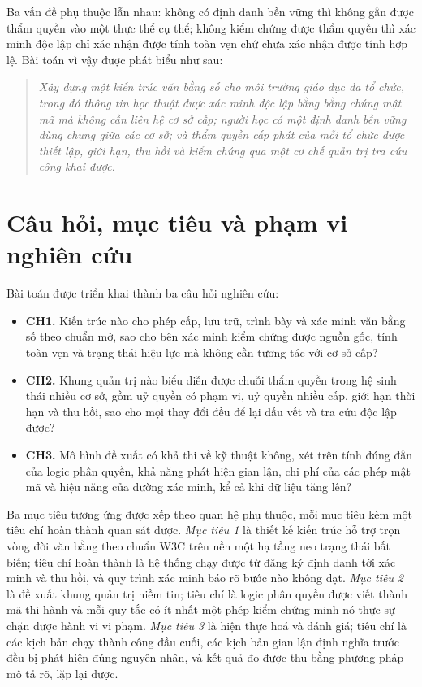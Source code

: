 Ba vấn đề phụ thuộc lẫn nhau: không có định danh bền vững thì không gắn được thẩm quyền vào một thực thể cụ thể; không kiểm chứng được thẩm quyền thì xác minh độc lập chỉ xác nhận được tính toàn vẹn chứ chưa xác nhận được tính hợp lệ. Bài toán vì vậy được phát biểu như sau:

\begin{quote}
\textit{Xây dựng một kiến trúc văn bằng số cho môi trường giáo dục đa tổ chức, trong đó thông tin học thuật được xác minh độc lập bằng bằng chứng mật mã mà không cần liên hệ cơ sở cấp; người học có một định danh bền vững dùng chung giữa các cơ sở; và thẩm quyền cấp phát của mỗi tổ chức được thiết lập, giới hạn, thu hồi và kiểm chứng qua một cơ chế quản trị tra cứu công khai được.}
\end{quote}

\section{Câu hỏi, mục tiêu và phạm vi nghiên cứu}
\label{sec:cau-hoi}

Bài toán được triển khai thành ba câu hỏi nghiên cứu:

\begin{itemize}
    \item \textbf{CH1.} Kiến trúc nào cho phép cấp, lưu trữ, trình bày và xác minh văn bằng số theo chuẩn mở, sao cho bên xác minh kiểm chứng được nguồn gốc, tính toàn vẹn và trạng thái hiệu lực mà không cần tương tác với cơ sở cấp?
    \item \textbf{CH2.} Khung quản trị nào biểu diễn được chuỗi thẩm quyền trong hệ sinh thái nhiều cơ sở, gồm uỷ quyền có phạm vi, uỷ quyền nhiều cấp, giới hạn thời hạn và thu hồi, sao cho mọi thay đổi đều để lại dấu vết và tra cứu độc lập được?
    \item \textbf{CH3.} Mô hình đề xuất có khả thi về kỹ thuật không, xét trên tính đúng đắn của logic phân quyền, khả năng phát hiện gian lận, chi phí của các phép mật mã và hiệu năng của đường xác minh, kể cả khi dữ liệu tăng lên?
\end{itemize}

Ba mục tiêu tương ứng được xếp theo quan hệ phụ thuộc, mỗi mục tiêu kèm một tiêu chí hoàn thành quan sát được. \textit{Mục tiêu 1} là thiết kế kiến trúc hỗ trợ trọn vòng đời văn bằng theo chuẩn W3C trên nền một hạ tầng neo trạng thái bất biến; tiêu chí hoàn thành là hệ thống chạy được từ đăng ký định danh tới xác minh và thu hồi, và quy trình xác minh báo rõ bước nào không đạt. \textit{Mục tiêu 2} là đề xuất khung quản trị niềm tin; tiêu chí là logic phân quyền được viết thành mã thi hành và mỗi quy tắc có ít nhất một phép kiểm chứng minh nó thực sự chặn được hành vi vi phạm. \textit{Mục tiêu 3} là hiện thực hoá và đánh giá; tiêu chí là các kịch bản chạy thành công đầu cuối, các kịch bản gian lận định nghĩa trước đều bị phát hiện đúng nguyên nhân, và kết quả đo được thu bằng phương pháp mô tả rõ, lặp lại được.

